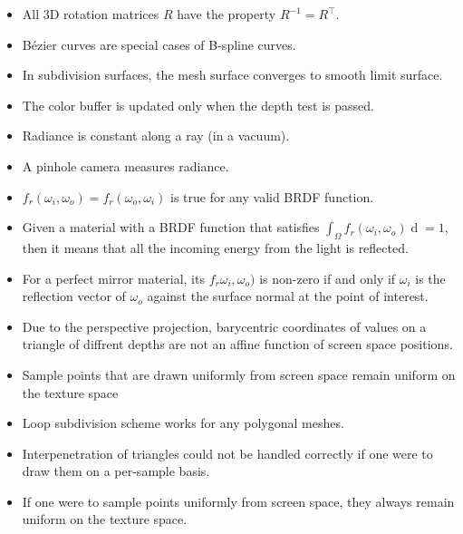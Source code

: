 \begin{itemize}
    \item[\cmark] All 3D rotation matrices \( R \) have the property \( R^{-1} = R^\top \).
    \item[\cmark] Bézier curves are special cases of B-spline curves.
    \item[\cmark] In subdivision surfaces, the mesh surface converges to smooth limit surface.
    \item[\cmark] The color buffer is updated only when the depth test is passed.
    \item[\cmark] Radiance is constant along a ray (in a vacuum).
    \item[\cmark] A pinhole camera measures radiance.
    \item[\cmark] \( f_r(\omega_i, \omega_o) = f_r(\omega_o, \omega_i) \) is true for any valid BRDF function.
    \item[\cmark] Given a material with a BRDF function that satisfies \( \int_\Omega f_r(\omega_i, \omega_o) \mathop{d\omega_i} = 1 \), then it means that all the incoming energy from the light is reflected.
    \item[\cmark] For a perfect mirror material, its \( f_r \omega _i, \omega _o) \) is non-zero if and only if \( \omega _i \) is the reflection vector of \( \omega _o \) against the surface normal at the point of interest.
    \item[\cmark] Due to the perspective projection, barycentric coordinates of values on a triangle of diffrent depths are not an affine function of screen space positions.
    \item[\xmark] Sample points that are drawn uniformly from screen space remain uniform on the texture space
    \item[\xmark] Loop subdivision scheme works for any polygonal meshes.
    \item[\xmark] Interpenetration of triangles could not be handled correctly if one were to draw them on a per-sample basis.
    \item[\xmark] If one were to sample points uniformly from screen space, they always remain uniform on the texture space.
\end{itemize}